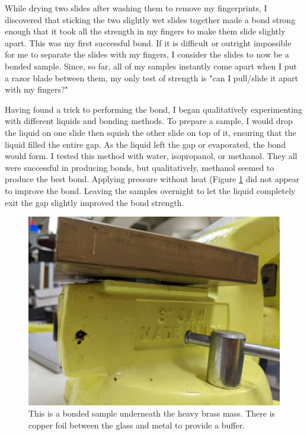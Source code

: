 \documentclass[colorlinks=true,pdfstartview=FitV,linkcolor=blue,
            citecolor=red,urlcolor=magenta]{ligodoc}
\begin{document}
While drying two slides after washing them to remove my fingerprints, I discovered that sticking the two slightly wet slides together made a bond strong enough that it took all the strength in my fingers to make them slide slightly apart. This was my first successful bond. If it is difficult or outright impossible for me to separate the slides with my fingers, I consider the slides to now be a bonded sample. Since, so far, all of my samples instantly come apart when I put a razor blade between them, my only test of strength is "can I pull/slide it apart with my fingers?"

Having found a trick to performing the bond, I began qualitatively experimenting with different liquids and bonding methods. To prepare a sample, I would drop the liquid on one slide then squish the other slide on top of it, ensuring that the liquid filled the entire gap. As the liquid left the gap or evaporated, the bond would form. I tested this method with water, isopropanol, or methanol. They all were successful in producing bonds, but qualitatively, methanol seemed to produce the best bond. Applying pressure  without heat (Figure \ref{fig:squished_sample} did not appear to improve the bond. Leaving the samples overnight to let the liquid completely exit the gap slightly improved the bond strength.

\begin{figure}[htbp]
\begin{center}
\includegraphics[width=6in]{graphics/squished_sample_PXL_20220712_025117243.jpg}
\caption{This is a bonded sample underneath the heavy brass mass. There is copper foil between the glass and metal to provide a buffer.}
\label{fig:squished_sample}
\end{center}
\end{figure}
\end{document}
